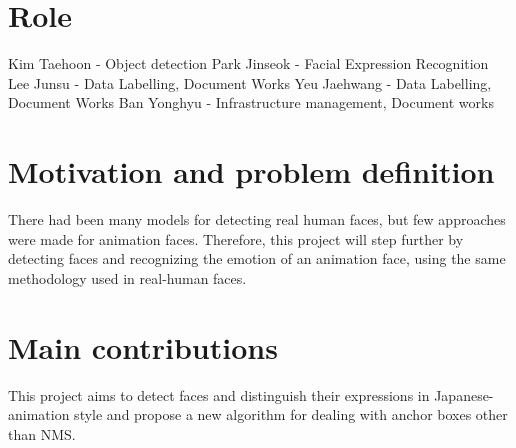 \documentclass{article}
\begin{document}


%
%


\section{Role}
Kim Taehoon - Object detection\newline
Park Jinseok - Facial Expression Recognition\newline
Lee Junsu - Data Labelling, Document Works\newline
Yeu Jaehwang - Data Labelling, Document Works\newline
Ban Yonghyu - Infrastructure management, Document works\newline


\section{Motivation and problem definition}
There had been many models for detecting real human faces, but few approaches
were made for animation faces. Therefore, this project will step further by
detecting faces and recognizing the emotion of an animation face, using the same
methodology used in real-human faces.

\section{Main contributions}
This project aims to detect faces and distinguish their expressions in
Japanese-animation style and propose a new algorithm for dealing with anchor
boxes other than NMS.
\end{document}
